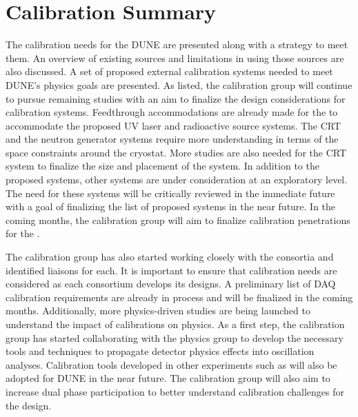 
\section{Calibration Summary}
\label{sec:calibsum}
The calibration needs for the DUNE  are presented along with a strategy to meet them. An overview of existing sources and limitations in using those sources are also discussed. A set of proposed external calibration systems needed to meet DUNE's physics goals are presented. As listed, the calibration group 
will continue to pursue remaining studies with an aim to finalize the design considerations for calibration systems. Feedthrough accommodations are already made for the  to accommodate the proposed UV laser and radioactive source systems. The CRT and the neutron generator systems require more understanding in terms of the space constraints around the cryostat. More studies are also needed for the CRT system to finalize the size and placement of the system. In addition to the proposed systems, %
other systems are under %
consideration at an exploratory level. The need for these systems will be critically reviewed in the immediate future with a goal of finalizing the list of proposed systems in the near future. In the coming months, the calibration group will aim to finalize calibration penetrations for the . 

The calibration group has also started working closely with the consortia %
and identified liaisons for each. %
It is important to ensure that calibration needs are considered as each consortium develops its %
designs. A preliminary list of DAQ %
calibration requirements are already in process and %
will be finalized in the coming months. Additionally, more physics-driven studies are %
being launched to understand the impact of calibrations on \lbl physics. As a first step, the calibration group has started collaborating with the \lbl physics group to develop the necessary tools and techniques to propagate detector physics effects into oscillation analyses. Calibration tools developed in other experiments such as \microboone will also be adopted for DUNE in the near future. The calibration group will also aim to increase dual phase participation to better understand calibration challenges for the  design.  


